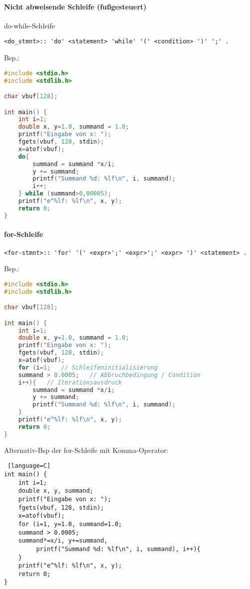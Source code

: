 \paragraph{Nicht abweisende Schleife (fußgesteuert)} do-while-Schleife
\begin{lstlisting}
<do_stmnt>:: 'do' <statement> 'while' '(' <condition> ')' ';' .
\end{lstlisting}

Bsp.:
\begin{lstlisting}[language=C]
#include <stdio.h>
#include <stdlib.h>

char vbuf[128];

int main() {
	int i=1;
	double x, y=1.0, summand = 1.0;
	printf("Eingabe von x: ");
	fgets(vbuf, 128, stdin);
	x=atof(vbuf);
	do{
		summand = summand *x/i;
		y += summand;
		printf("Summand %d: %lf\n", i, summand);
		i++;
	} while (summand>0,00005);
	printf("e^%lf: %lf\n", x, y);
	return 0;
}
\end{lstlisting}

\paragraph{for-Schleife}
\begin{lstlisting}
<for-stmnt>:: 'for' '(' <expr>';' <expr>';' <expr> ')' <statement> .
\end{lstlisting}

Bsp.:
\begin{lstlisting}[language=C]
#include <stdio.h>
#include <stdlib.h>

char vbuf[128];

int main() {
	int i=1;
	double x, y=1.0, summand = 1.0;
	printf("Eingabe von x: ");
	fgets(vbuf, 128, stdin);
	x=atof(vbuf);
	for (i=1; 	// Schleifeninitialisierung
	summand > 0.0005; 	// Abbruchbedingung / Condition
	i++){	// Iterationsausdruck
		summand = summand *x/i;
		y += summand;
		printf("Summand %d: %lf\n", i, summand);
	}
	printf("e^%lf: %lf\n", x, y);
	return 0;
}
\end{lstlisting}

Alternativ-Bsp der for-Schleife mit Komma-Operator:
\begin{lstlisting} [language=C]
int main() {
	int i=1;
	double x, y, summand;
	printf("Eingabe von x: ");
	fgets(vbuf, 128, stdin);
	x=atof(vbuf);
	for (i=1, y=1.0, summand=1.0;
	summand > 0.0005;
	summand*=x/i, y+=summand,
		 printf("Summand %d: %lf\n", i, summand), i++){
	}
	printf("e^%lf: %lf\n", x, y);
	return 0;
}
\end{lstlisting}

